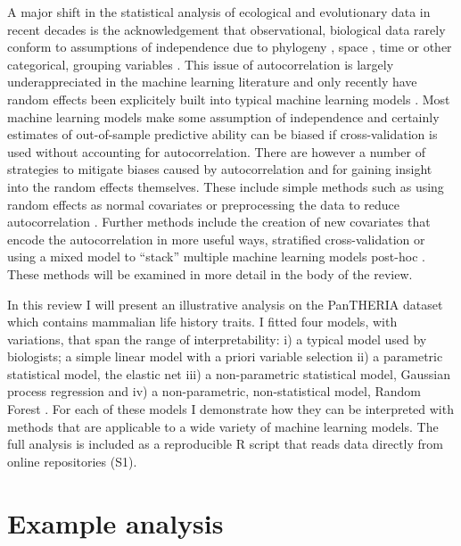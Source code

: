 \documentclass[10pt,]{article}
\begin{document}
A major shift in the statistical analysis of ecological and evolutionary data in recent decades is the acknowledgement that observational, biological data rarely conform to assumptions of independence due to phylogeny \citep{felsenstein1985phylogenies, ives2006statistics}, space \citep{redding2017evaluating, diggle1998model}, time \citep{ives2006statistics} or other categorical, grouping variables \citep{harrison2018brief, bolker2009generalized}.
This issue of autocorrelation is largely underappreciated in the machine learning literature and only recently have random effects been explicitely built into typical machine learning models \citep{eo2014tree, hajjem2014mixed, hajjem2017generalized, miller2017gradient}.
Most machine learning models make some assumption of independence and certainly estimates of out-of-sample predictive ability can be biased if cross-validation is used without accounting for autocorrelation.
There are however a number of strategies to mitigate biases caused by autocorrelation and for gaining insight into the random effects themselves.
These include simple methods such as using random effects as normal covariates or preprocessing the data to reduce autocorrelation \citep{elith2010art}.
Further methods include the creation of new covariates that encode the autocorrelation in more useful ways, stratified cross-validation \citep{le2014spatial} or using a mixed model to ``stack'' multiple machine learning models post-hoc \citep{bhatt2017improved}.
These methods will be examined in more detail in the body of the review.

In this review I will present an illustrative analysis on the PanTHERIA dataset \citep{jones2009pantheria} which contains mammalian life history traits.
I fitted four models, with variations, that span the range of interpretability: i) a typical model used by biologists; a simple linear model with a priori variable selection ii) a parametric statistical model, the elastic net \citep{elasticnet} iii) a non-parametric statistical model, Gaussian process regression \citep{rasmussen2004gaussian} and iv) a non-parametric, non-statistical model, Random Forest \citep{breiman2001random}.
For each of these models I demonstrate how they can be interpreted with methods that are applicable to a wide variety of machine learning models.
The full analysis is included as a reproducible R \citep{R} script that reads data directly from online repositories (S1).

\section{Example analysis}\label{example-analysis}
\end{document}
